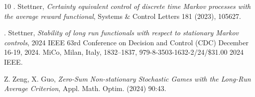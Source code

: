 \documentclass[10pt,english]{extarticle}
\begin{document}
\begin{thebibliography}{10}
{\sc {\L}. Stettner}, {\em Certainty equivalent control of discrete time Markov processes with the average reward functional}, Systems \& Control Letters 181 (2023), 105627.

 {\sc {\L}. Stettner}, {\em Stability of long run functionals with respect to stationary Markov controls}, 2024 IEEE 63rd Conference on Decision and Control (CDC)
December 16-19, 2024. MiCo, Milan, Italy, 1832--1837, 979-8-3503-1632-2/24/\$31.00 2024 IEEE.

 {\sc Z. Zeng, X. Guo}, {\em Zero-Sum Non-stationary Stochastic Games with the Long-Run Average Criterion}, Appl. Math. Optim. (2024) 90:43.
\end{thebibliography}
\end{document}
